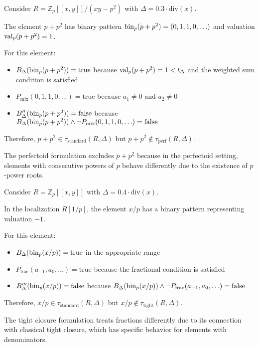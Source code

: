 \begin{example}\label{ex:perfectoid-standard}
Consider $R = \mathbb{Z}_p[[x,y]]/(xy-p^2)$ with $\Delta = 0.3 \cdot \text{div}(x)$.

The element $p + p^2$ has binary pattern $\operatorname{bin}_p(p + p^2) = (0, 1, 1, 0, \ldots)$ and valuation $\operatorname{val}_p(p + p^2) = 1$.

For this element:
\begin{itemize}
    \item $B_\Delta(\operatorname{bin}_p(p + p^2)) = \text{true}$ because $\operatorname{val}_p(p + p^2) = 1 < t_\Delta$ and the weighted sum condition is satisfied
    \item $P_{\text{mix}}(0, 1, 1, 0, \ldots) = \text{true}$ because $a_1 \neq 0$ and $a_2 \neq 0$
    \item $B''_\Delta(\operatorname{bin}_p(p + p^2)) = \text{false}$ because $B_\Delta(\operatorname{bin}_p(p + p^2)) \wedge \neg P_{\text{mix}}(0, 1, 1, 0, \ldots) = \text{false}$
\end{itemize}

Therefore, $p + p^2 \in \tau_{\text{standard}}(R,\Delta)$ but $p + p^2 \notin \tau_{\text{perf}}(R,\Delta)$.

The perfectoid formulation excludes $p + p^2$ because in the perfectoid setting, elements with consecutive powers of $p$ behave differently due to the existence of $p$-power roots.
\end{example}

\begin{example}\label{ex:tight-standard}
Consider $R = \mathbb{Z}_p[[x,y]]$ with $\Delta = 0.4 \cdot \text{div}(x)$.

In the localization $R[1/p]$, the element $x/p$ has a binary pattern representing valuation $-1$.

For this element:
\begin{itemize}
    \item $B_\Delta(\operatorname{bin}_p(x/p)) = \text{true}$ in the appropriate range
    \item $P_{\text{frac}}(a_{-1}, a_0, \ldots) = \text{true}$ because the fractional condition is satisfied
    \item $B'''_\Delta(\operatorname{bin}_p(x/p)) = \text{false}$ because $B_\Delta(\operatorname{bin}_p(x/p)) \wedge \neg P_{\text{frac}}(a_{-1}, a_0, \ldots) = \text{false}$
\end{itemize}

Therefore, $x/p \in \tau_{\text{standard}}(R,\Delta)$ but $x/p \notin \tau_{\text{tight}}(R,\Delta)$.

The tight closure formulation treats fractions differently due to its connection with classical tight closure, which has specific behavior for elements with denominators.
\end{example}

